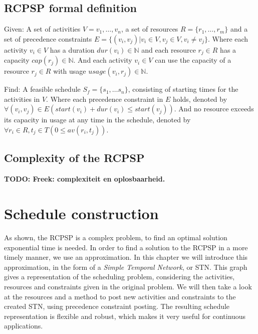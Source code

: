 \documentclass{article}
\theoremstyle{definition}
\newcommand{\TODO}[1]{{\color{red}\textbf{TODO: #1}}}
\newcommand{\av}[2]{\ensuremath{av(r_{#1}, t_{#2})}} %
\newcommand{\capa}[1]{\ensuremath{cap(r_{#1})}} %
\newcommand{\dur}[1]{\ensuremath{dur(v_{#1})}} %
\newcommand{\usage}[2]{\ensuremath{usage(v_{#1}, r_{#2})}} %
\newcommand{\start}[1]{\ensuremath{start(v_{#1})}} %
\newenvironment{definition}[1][Definition]{\begin{trivlist}
\item[\hskip \labelsep {\bfseries #1}]}{\end{trivlist}}
\begin{document}
\subsection{RCPSP formal definition}

\begin{definition}
Given:
A set of activities $V = v_1, \ldots, v_n$, a set of resources $R = \{r_1, \ldots, r_m\}$ and a set of precedence constraints $E =  \{(v_i, v_j) | v_i \in V, v_j \in V, v_i \neq v_j\}$.
Where each activity $v_i \in V$ has a duration $\dur{i} \in \mathbb{N}$ and each resource $r_j \in R$ has a capacity $\capa{j} \in \mathbb{N}$. 
And each activity $v_i \in V$ can use the capacity of a resource $r_j \in R$ with usage $\usage{i}{j} \in \mathbb{N}$.

Find:
A feasible schedule $S_f = \{s_1, \ldots s_n\}$, consisting of starting times for the activities in $V$.
Where each precedence constraint in $E$ holds, denoted by $\forall (v_i, v_j) \in E (\start{i} + \dur{i} \leq \start{j})$.
And no resource exceeds its capacity in usage at any time in the schedule, denoted by $\forall r_i \in R, t_j \in T (0 \leq \av{i}{j})$.
\end{definition}


\subsection{Complexity of the RCPSP}
\TODO{Freek: complexiteit en oplosbaarheid.}


\newpage


\section{Schedule construction}

As shown, the RCPSP is a complex problem, to find an optimal solution exponential time is needed.
In order to find a solution to the RCPSP in a more timely manner, we use an approximation.
In this chapter we will introduce this approximation, in the form of a \emph{Simple Temporal Network}, or STN.
This graph gives a representation of the scheduling problem, considering the activities, resources and constraints given in the original problem.
We will then take a look at the resources and a method to post new activities and constraints to the created STN, using precedence constraint posting.
The resulting schedule representation is flexible and robust, which makes it very useful for continuous applications.
\end{document}
